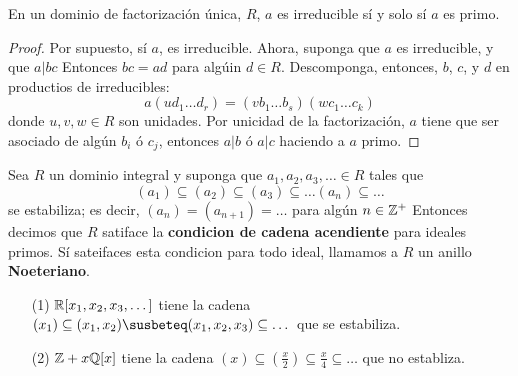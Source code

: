 \begin{lemma}\label{16.68}
    En un dominio de factorizaci\'on \'unica, $R$,  $a$ es irreducible s\'i y
    solo s\'i $a$ es primo.
\end{lemma}
\begin{proof}
    Por supuesto, s\'i $a$, es irreducible. Ahora, suponga que $a$ es
    irreducible, y que $a|bc$ Entonces $bc=ad$ para alg\'uin  $d \in R$.
    Descomponga, entonces,  $b$, $c$, y $d$ en productios de irreducibles:
    \begin{equation*}
        a(ud_1 \dots d_r)=(vb_1 \dots b_s)(wc_1 \dots c_k)
    \end{equation*}
    donde $u,v,w \in R$ son unidades. Por unicidad de la factorizaci\'on, $a$
    tiene que ser asociado de alg\'un $b_i$ \'o  $c_j$, entonces $a|b$ \'o $a|c$
    haciendo a $a$ primo.
\end{proof}

\begin{definition}
    Sea $R$ un dominio integral y suponga que $a_1, a_2, a_3, \dots \in R$ tales
    que
    \begin{equation*}
        (a_1) \subseteq (a_2) \subseteq (a_3) \subseteq \dots (a_n) \subseteq \dots
    \end{equation*}
    se estabiliza; es decir, $(a_n)=(a_{n+1})=\dots$ para alg\'un $n \in \mathbb{Z}^+$
    Entonces decimos que $R$ satiface la  \textbf{condicion de cadena
    acendiente} para ideales primos. S\'i sateifaces esta condicion
    para todo ideal, llamamos a $R$ un anillo \textbf{Noeteriano}.
\end{definition}

\begin{example}\label{}
    \begin{enumerate}
        \item[(1)] $\mathbb{R}[x_1,x_2,x_3, \dots]$ tiene la cadena $(x_1) \subseteq
            (x_1,x_2) \susbeteq (x_1,x_2,x_3) \subseteq \dots$ que se
            estabiliza.

        \item[(2)] $\mathbb{Z}+x\mathbb{Q}[x]$ tiene la cadena $(x) \subseteq (\frac{x}{2})
            \subseteq \frac{x}{4} \subseteq \dots$ que no establiza.
    \end{enumerate}
\end{example}

